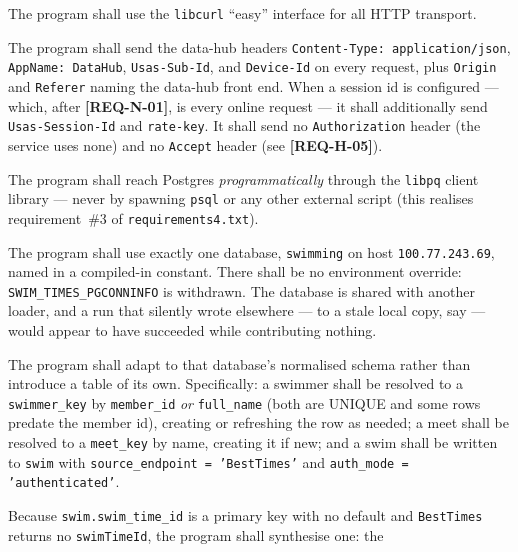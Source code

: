 \documentclass[12pt]{article}
\newcommand{\code}[1]{\texttt{#1}}
\newcommand{\req}[1]{\textbf{[#1]}}
\begin{document}
\begin{description}[style=nextline]
  \item[\req{REQ-I-10}] The program shall use the
        \code{libcurl} ``easy'' interface for all HTTP transport.
  \item[\req{REQ-I-11}] The program shall send the data-hub headers
        \code{Content-Type: application/json}, \code{AppName: DataHub},
        \code{Usas-Sub-Id}, and \code{Device-Id} on every request, plus
        \code{Origin} and \code{Referer} naming the data-hub front end.
        When a session id is configured --- which, after
        \req{REQ-N-01}, is every online request --- it shall
        additionally send \code{Usas-Session-Id} and \code{rate-key}.  It shall send no
        \code{Authorization} header (the service uses none) and no
        \code{Accept} header (see \req{REQ-H-05}).
  \item[\req{REQ-I-12}] The program shall reach Postgres
        \emph{programmatically} through the \texttt{libpq} client
        library --- never by spawning \texttt{psql} or any other
        external script (this realises requirement~\#3 of
        \texttt{requirements4.txt}).
  \item[\req{REQ-I-13}] The program shall use exactly one database,
        \texttt{swimming} on host \texttt{100.77.243.69}, named in a
        compiled-in constant.  There shall be no environment override:
        \texttt{SWIM\_TIMES\_PGCONNINFO} is withdrawn.  The database is
        shared with another loader, and a run that silently wrote
        elsewhere --- to a stale local copy, say --- would appear to have
        succeeded while contributing nothing.
  \item[\req{REQ-I-14}] The program shall adapt to that database's
        normalised schema rather than introduce a table of its own.
        Specifically: a swimmer shall be resolved to a
        \texttt{swimmer\_key} by \texttt{member\_id} \emph{or}
        \texttt{full\_name} (both are UNIQUE and some rows predate the
        member id), creating or refreshing the row as needed; a meet
        shall be resolved to a \texttt{meet\_key} by name, creating it
        if new; and a swim shall be written to \texttt{swim} with
        \texttt{source\_endpoint = 'BestTimes'} and
        \texttt{auth\_mode = 'authenticated'}.
  \item[\req{REQ-I-15}] Because \texttt{swim.swim\_time\_id} is a
        primary key with no default and \texttt{BestTimes} returns no
        \texttt{swimTimeId}, the program shall synthesise one: the

\end{description}
\end{document}

